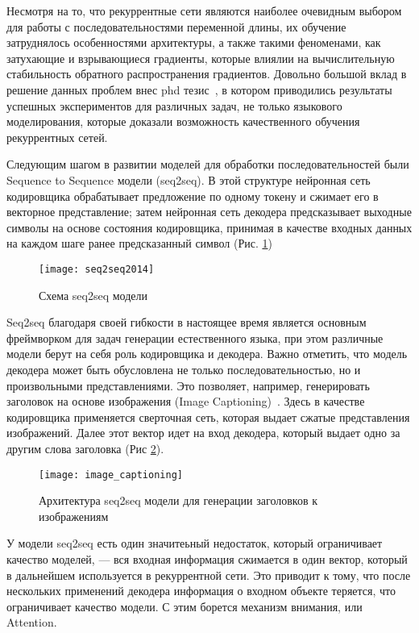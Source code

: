 Несмотря на то, что рекуррентные сети являются наиболее очевидным выбором для работы с последовательностями переменной длины, их обучение затруднялось особенностями архитектуры, а также такими феноменами, как затухающие и взрывающиеся градиенты, которые влиялии на вычислительную стабильность обратного распространения градиентов. Довольно большой вклад в решение данных проблем внес phd тезис~\cite{sutskever2013training}, в котором приводились результаты успешных экспериментов для различных задач, не только языкового моделирования, которые доказали возможность качественного обучения рекуррентных сетей.

Следующим шагом в развитии моделей для обработки последовательностей были Sequence to Sequence модели (seq2seq). В этой структуре нейронная сеть кодировщика обрабатывает предложение по одному токену и сжимает его в векторное представление; затем нейронная сеть декодера предсказывает выходные символы на основе состояния кодировщика, принимая в качестве входных данных на каждом шаге ранее предсказанный символ (Рис. \ref{fig:seq2seq})

\begin{figure}[ht]
	\centering
	\texttt{[image: seq2seq2014]}  
	\caption{ Схема seq2seq модели }
	\label{fig:seq2seq}
\end{figure}

Seq2seq благодаря своей гибкости в настоящее время является основным фреймворком для задач генерации естественного языка, при этом различные модели берут на себя роль кодировщика и декодера. Важно отметить, что модель декодера может быть обусловлена не только последовательностью, но и произвольными представлениями. Это позволяет, например, генерировать заголовок на основе изображения (Image Captioning)~\cite{image-captioning}. Здесь в качестве кодировщика применяется сверточная сеть, которая выдает сжатые представления изображений. Далее этот вектор идет на вход декодера, который выдает одно за другим слова заголовка (Рис \ref{fig:image_captioning}).
\begin{figure}[ht]
	\centering
	\texttt{[image: image\_captioning]}  
	\caption{ Архитектура seq2seq модели для генерации заголовков к изображениям }
	\label{fig:image_captioning}
\end{figure}

У модели seq2seq есть один значитеьный недостаток, который ограничивает качество моделей, --- вся входная информация сжимается в один вектор, который в дальнейшем используется в рекуррентной сети. Это приводит к тому, что после нескольких применений декодера информация о входном объекте теряется, что ограничивает качество модели. С этим борется механизм внимания, или Attention.

